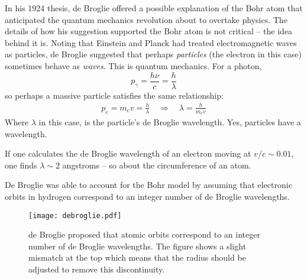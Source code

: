 In his 1924 thesis, de Broglie offered a possible explanation of the Bohr atom
that anticipated the quantum mechanics revolution about to overtake physics.
The details of how his suggestion supported the Bohr atom is not critical --
the idea behind it is. Noting that Einstein and Planck had treated
electromagnetic waves as particles, de Broglie suggested that perhaps
\textit{particles} (the electron in this case) sometimes behave as
\textit{waves}. This is quantum mechanics. For a photon, 
\[
p_\gamma = \frac{h\nu}{c} = \frac{h}{\lambda}
\] 
so perhaps a massive particle satisfies the same relationship:
\begin{align} \label{eq:deBroglie}
p_e = m_e v = \frac{h}{\lambda} \quad \Rightarrow \quad \lambda = \frac{h}{m_e v}
\end{align}
Where $\lambda$ in this case, is the particle's de Broglie wavelength. Yes,
particles have a wavelength. 

If one calculates the de Broglie wavelength of an electron moving at $v/c \sim
0.01$, one finds $\lambda \sim 2$ angstroms -- so about the circumference of an
  atom.

De Broglie was able to account for the Bohr model by assuming that electronic
orbits in hydrogen correspond to an integer number of de Broglie wavelengths. 

\begin{figure}[H]
  \centering
    \texttt{[image: debroglie.pdf]}
    \caption{de Broglie proposed that atomic orbits correspond to an integer
      number of de Broglie wavelengths. The figure shows a slight mismatch at
      the top which means that the radius should be adjusted to remove this
    discontinuity.} 
\end{figure}

\onecolumn
